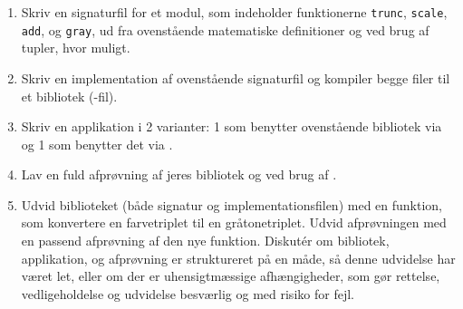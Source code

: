 \documentclass[a4paper,12pt]{article}
\begin{document}
\begin{enumerate}[label=4ø.\arabic*,start=0]
\item Skriv en signaturfil for et modul, som indeholder funktionerne \lstinline{trunc}, \lstinline{scale}, \lstinline{add}, og \lstinline{gray}, ud fra ovenstående matematiske definitioner og ved brug af tupler, hvor muligt.
\item Skriv en implementation af ovenstående signaturfil og kompiler begge filer til et bibliotek (-fil).
\item Skriv en applikation i 2 varianter: 1 som benytter ovenstående bibliotek via  og 1 som benytter det via .
\item Lav en fuld afprøvning af jeres bibliotek og ved brug af .
\item Udvid biblioteket (både signatur og implementationsfilen) med en funktion, som konvertere en farvetriplet til en gråtonetriplet. Udvid afprøvningen med en passend afprøvning af den nye funktion. Diskut\'{e}r om bibliotek, applikation, og afprøvning er struktureret på en måde, så denne udvidelse har været let, eller om der er uhensigtmæssige afhængigheder, som gør rettelse, vedligeholdelse og udvidelse besværlig og med risiko for fejl.
\end{enumerate}
\end{document}
